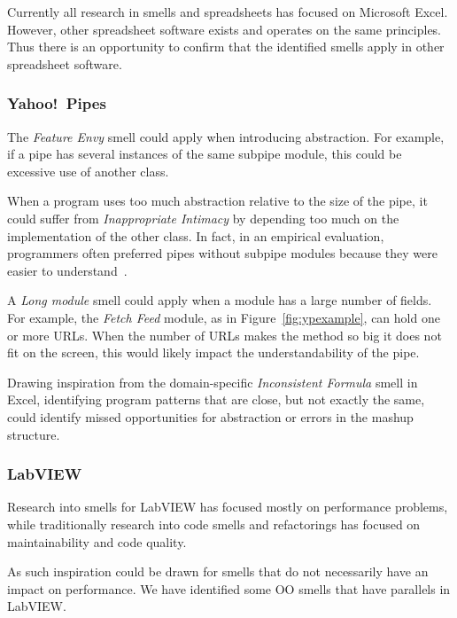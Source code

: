 \documentclass[10pt,conference,compsocconf]{IEEEtran}
\begin{document}
Currently all research in smells and spreadsheets has focused on Microsoft Excel.
However, other spreadsheet software exists and operates on the same principles.
Thus there is an opportunity to confirm that the identified smells apply in other spreadsheet software.

\subsubsection{Yahoo!\ Pipes}
\label{sec:smells:future:yp}
The \emph{Feature Envy} smell could  apply when introducing abstraction. For example, if a pipe has several instances of the same subpipe module, this could be excessive use of another class. 

When a program uses too much abstraction relative to the size of the pipe, it could suffer from \emph{Inappropriate Intimacy} by depending too much on the implementation of the other class. In fact, in an empirical evaluation, programmers often preferred pipes without subpipe modules because they were easier to understand~\cite{StoleeTSE2013}. 

A \emph{Long module} smell could apply when a module has a large number of fields. For example, the \emph{Fetch Feed} module, as in Figure~\ref{fig:ypexample}, can hold one or more URLs. When the number of URLs makes the method so big it does not fit on the screen, this would likely impact the understandability of the pipe. 

Drawing inspiration from the domain-specific \emph{Inconsistent Formula} smell in Excel, identifying program patterns that are close, but not exactly the same, could identify missed opportunities for abstraction or errors in the mashup structure. 

\subsubsection{LabVIEW}

Research into smells for LabVIEW has focused mostly on performance problems, while traditionally research into code smells and refactorings has focused on maintainability and code quality.

As such inspiration could be drawn for smells that do not necessarily have an impact on performance.
We have identified some OO smells that have parallels in LabVIEW.
\end{document}
